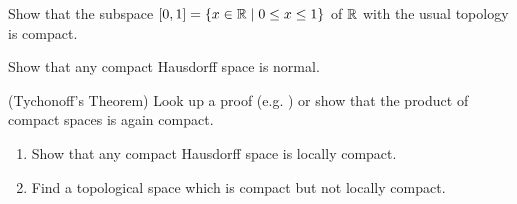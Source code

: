 \begin{exercise}\label{exer:Icompact}
Show that the subspace $[0,1]=\{x\in \mathbb{R}\mid 0\leq x\leq 1\}$ of $\mathbb{R}$ with the usual topology is compact.
\end{exercise}

\begin{exercise}\label{exer:compHaus-normal}
Show that any compact Hausdorff space is normal. 
\end{exercise}

\begin{exercise}\label{exer:Tychonoff}
(Tychonoff's Theorem) Look up a proof (e.g. \cite[Theorem 3.2.4, p.138]{Engelking89}) or show that the product of compact spaces is again compact.
\end{exercise}


\begin{exercise}\label{exer:loccompact}
\begin{enumerate}
	\item Show that any compact Hausdorff space is locally compact. 
	\item Find a topological space which is compact but not locally compact.
\end{enumerate}
\end{exercise}

